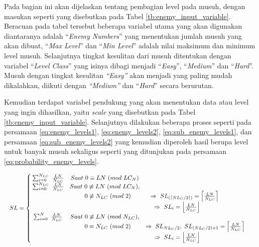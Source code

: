 Pada bagian ini akan dijelaskan tentang pembagian level pada musuh, dengan masukan seperti yang disebutkan pada Tabel \ref{tb:enemy_input_variable}. Beracuan pada tabel tersebut beberapa variabel utama yang akan digunakan diantaranya adalah ``\textit{Enemy Numbers}'' yang menentukan jumlah musuh yang akan dibuat, ``\textit{Max Level}'' dan ``\textit{Min Level}'' adalah nilai maksimum dan minimum level musuh. Selanjutnya tingkat kesulitan dari musuh ditentukan dengan variabel ``\textit{Level Class}'' yang isinya dibagi menjadi ``\textit{Easy}'', ``\textit{Medium}'' dan ``\textit{Hard}''. Musuh dengan tingkat kesulitan \textit{``Easy''} akan menjadi yang paling mudah dikalahkan, diikuti dengan \textit{``Medium''} dan ``\textit{Hard}'' secara berurutan.
\vspace{1ex}

Kemudian terdapat variabel pendukung yang akan menentukan data atau level yang ingin dihasilkan, yaitu \textit{scale} yang disebutkan pada Tabel \ref{tb:enemy_input_variable}. Selanjutnya dilakukan beberapa proses seperti pada persamaan \ref{eq:enemy_levels1}, \ref{eq:enemy_levels2}, \ref{eq:sub_enemy_levels1}, dan persamaan \ref{eq:sub_enemy_levels2} yang kemudian diperoleh hasil berupa level untuk banyak musuh sekaligus seperti yang ditunjukan pada persamaan \ref{eq:probability_enemy_levels}.
\vspace{1ex}

\begin{equation}\label{eq:enemy_levels1}
	\resizebox{\columnwidth}{!}{%
		$SL = \left\{\begin{matrix}
		\hspace{0.2em} \sum_{i = 0}^{N_{LC}}\ \frac{LN}{N_{LC}} & Saat\ 0 \equiv LN\ (mod\ LC_{N}) & \\
		
		\hspace{0.2em} \sum_{i = 0}^{N_{LC}}\ \frac{LN}{N_{LC}} & Saat\ 0 \not\equiv LN\ (mod\ LC_{N}), & \\
		&\hspace{1.0em}  0 \not\equiv N_{LC}\ (mod\ 2) & \hspace{-3.5em} \Rightarrow\ SL_{(\left \lceil NL_{C}/2 \right \rceil)}  = \left \lceil \frac{LN}{N_{LC}} \right \rceil &\\
		
		& & \hspace{-6.0em} \Rightarrow\ SL_{i}  = \left \lfloor \frac{LN}{N_{LC}} \right \rfloor &\\
		
		\hspace{0.2em} \sum_{i = 0}^{N}\ \frac{LN}{N_{LC}} & Saat\ 0 \not\equiv LN\ (mod\ N_{LC}), & \\
		&\hspace{1.0em}  0 \equiv N_{LC}\ (mod\ 2) & \Rightarrow\ SL_{NL_{C}/2},\ SL_{(NL_{C}/2) + 1}  = \left \lceil \frac{LN}{N_{LC}} \right \rceil &\\
		
		& & \hspace{-6.0em} \Rightarrow\ SL_{i}  = \left \lfloor \frac{LN}{N_{LC}} \right \rfloor &\\
		\end{matrix}\right.$%
	}
\end{equation}

